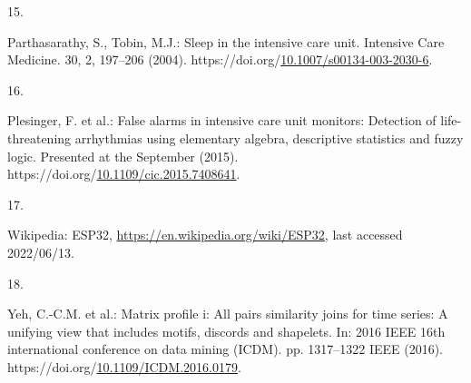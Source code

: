 \documentclass[runningheads]{llncs}
\newlength{\cslhangindent}
\newlength{\csllabelwidth}
\newenvironment{CSLReferences}[2] %
 {%
  \setlength{\parindent}{0pt}
  \ifodd #1 \everypar{\setlength{\hangindent}{\cslhangindent}}\ignorespaces\fi
  \ifnum #2 > 0
  \setlength{\parskip}{#2\baselineskip}
  \fi
 }%
 {}
\newcommand{\CSLLeftMargin}[1]{\parbox[t]{\csllabelwidth}{#1}}
\newcommand{\CSLRightInline}[1]{\parbox[t]{\linewidth - \csllabelwidth}{#1}\break}
\begin{document}
\begin{CSLReferences}{0}{0}
\leavevmode{}%
\CSLLeftMargin{15. }
\CSLRightInline{Parthasarathy, S., Tobin, M.J.: Sleep in the intensive care unit. Intensive Care Medicine. 30, 2, 197--206 (2004). https://doi.org/\href{https://doi.org/10.1007/s00134-003-2030-6}{10.1007/s00134-003-2030-6}.}

\leavevmode{}%
\CSLLeftMargin{16. }
\CSLRightInline{Plesinger, F. et al.: False alarms in intensive care unit monitors: Detection of life-threatening arrhythmias using elementary algebra, descriptive statistics and fuzzy logic. Presented at the September (2015). https://doi.org/\href{https://doi.org/10.1109/cic.2015.7408641}{10.1109/cic.2015.7408641}.}

\leavevmode{}%
\CSLLeftMargin{17. }
\CSLRightInline{Wikipedia: ESP32, \url{https://en.wikipedia.org/wiki/ESP32}, last accessed 2022/06/13.}

\leavevmode{}%
\CSLLeftMargin{18. }
\CSLRightInline{Yeh, C.-C.M. et al.: Matrix profile i: All pairs similarity joins for time series: A unifying view that includes motifs, discords and shapelets. In: 2016 IEEE 16th international conference on data mining (ICDM). pp. 1317--1322 IEEE (2016). https://doi.org/\href{https://doi.org/10.1109/ICDM.2016.0179}{10.1109/ICDM.2016.0179}.}

\end{CSLReferences}
\end{document}
